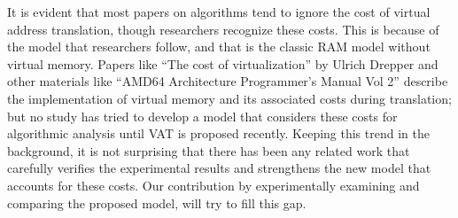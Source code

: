 It is evident that most papers on algorithms tend to ignore the cost of virtual address translation, though researchers recognize these costs. This is because of the model that researchers follow, and that is the classic RAM model without virtual memory. Papers like “The cost of virtualization” by Ulrich Drepper and other materials like “AMD64 Architecture Programmer’s Manual Vol 2” describe the implementation of virtual memory and its associated costs during translation; but no study has tried to develop a model that considers these costs for algorithmic analysis until VAT is proposed recently. Keeping this trend in the background, it is not surprising that there has been any related work that carefully verifies the experimental results and strengthens the new model that accounts for these costs. Our contribution by experimentally examining and comparing the proposed model, will try to fill this gap.  
